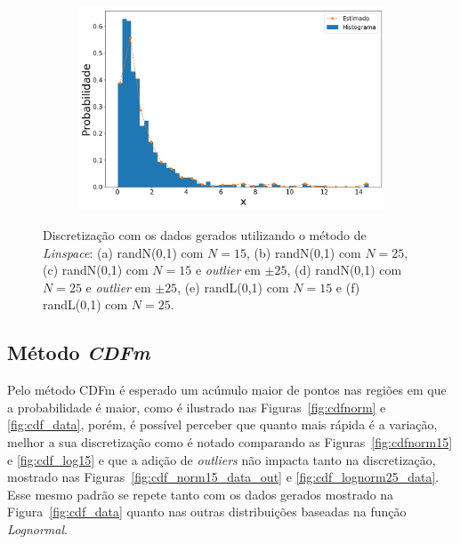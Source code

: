 \begin{figure}[H]
\begin{subfigure}[b]{0.45\textwidth}
		\includegraphics[width=\linewidth]{./figuras/Linspace_lognormal_25_1000}
		\caption{}
		\label{fig:lin_lognorm25_data}
	\end{subfigure}
	\caption{Discretização com os dados gerados utilizando o método de \textit{Linspace}: (a) randN(0,1) com $N = 15$, (b) randN(0,1) com $N = 25$, (c) randN(0,1) com $N = 15$ e \textit{outlier} em $\pm 25$, (d) randN(0,1) com $N = 25$ e \textit{outlier} em $\pm 25$, (e) randL(0,1) com $ N = 15 $ e (f) randL(0,1) com $ N = 25 $.}
	\label{fig:lin_data}
\end{figure}

\subsection{Método \textit{CDFm}}

Pelo método \ac{CDFm} é esperado um acúmulo maior de pontos nas regiões em que a probabilidade é maior, como é ilustrado nas Figuras~\ref{fig:cdfnorm} e \ref{fig:cdf_data}, porém, é possível perceber que quanto mais rápida é a variação, melhor a sua discretização como é notado comparando as Figuras~\ref{fig:cdfnorm15} e \ref{fig:cdf_log15} e que a adição de \textit{outliers} não impacta tanto na discretização, mostrado nas Figuras~\ref{fig:cdf_norm15_data_out} e \ref{fig:cdf_lognorm25_data}. Esse mesmo padrão se repete tanto com os dados gerados mostrado na Figura~\ref{fig:cdf_data} quanto nas outras distribuições baseadas na função \textit{Lognormal}.%

